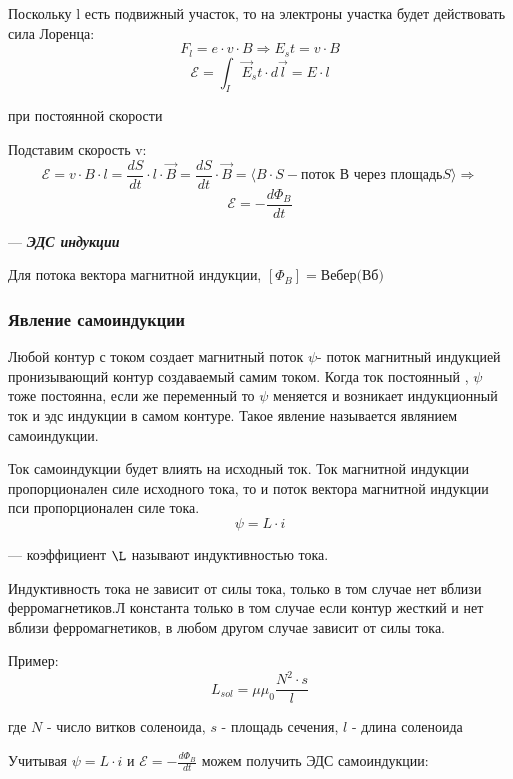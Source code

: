\documentclass[../main.tex]{subfiles}
\begin{document}
Поскольку l есть подвижный участок, то на электроны участка будет действовать сила Лоренца:
\[F_l = e \cdot v \cdot B \Rightarrow E_st = v \cdot B\]
\[\mathscr{E} = \int_{I} \vec E_st \cdot d \vec l = E \cdot l\]
\begin{center}
    при постоянной скорости
\end{center}

Подставим скорость v:
\[\mathscr{E} = v \cdot B \cdot l = \frac{dS}{dt} \cdot l \cdot \vec B = \frac{dS}{dt} \cdot \vec B = \langle B \cdot S - \text{поток В через площадь} S \rangle \Rightarrow\]
\[\mathscr{E} = - \frac{d \Phi_B}{dt}\]
\begin{center}
    --- \textit{\textbf{ЭДС индукции}}
\end{center}

Для потока вектора магнитной индукции, $[\Phi_B] = \text{Вебер(Вб)}$

\subsubsection{Явление самоиндукции}

Любой контур с током создает магнитный поток $\psi$- поток магнитный индукцией пронизывающий контур создаваемый самим током. Когда ток постоянный , $\psi$ тоже постоянна, если же переменный
то $\psi$ меняется и возникает индукционный ток и эдс индукции в самом контуре. Такое явление называется являнием самоиндукции.

Ток самоиндукции будет влиять на исходный ток. Ток магнитной индукции пропорционален силе исходного тока, то и поток вектора магнитной индукции пси пропорционален силе тока.
\[ \psi = L \cdot i\]
\begin{center}
    --- коэффициент $\L$ называют индуктивностью тока.
\end{center}

Индуктивность тока не зависит от силы тока, только в том случае нет вблизи ферромагнетиков.Л константа только в том случае если контур жесткий и нет вблизи ферромагнетиков, в
любом другом случае зависит от силы тока.

Пример:
\[L_{sol} = \mu \mu_0 \frac{N^2 \cdot s}{l}\]
\begin{center}
    где $N$ - число витков соленоида, $s$ - площадь сечения, $l$ - длина соленоида
\end{center}

Учитывая $\psi = L \cdot i$ и $\mathscr{E} = - \frac{d \Phi_B}{dt}$ можем получить ЭДС самоиндукции:
\end{document}
